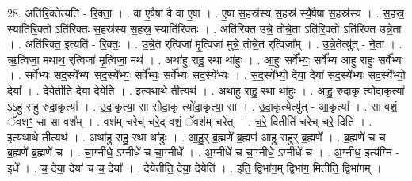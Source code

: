 \documentclass[17pt]{extarticle}
\begin{document}
28. अति॑रि॒क्तेत्यति॑ - रि॒क्ता॒ । . वा ए॒षैषा वै वा ए॒षा । . ए॒षा स॒हस्र॑स्य स॒हस्र॑ स्यै॒षैषा स॒हस्र॑स्य । . स॒हस्र॒ स्याति॑रि॒क्तो ऽति॑रिक्तः स॒हस्र॑स्य स॒हस्र॒ स्याति॑रिक्तः । . अति॑रिक्त उन्ने॒ तोन्ने॒ता ऽति॑रि॒क्तो ऽति॑रिक्त उन्ने॒ता । . अति॑रिक्त॒ इत्यति॑ - रि॒क्तः॒ । . उ॒न्ने॒त र्‌त्विजा॑ मृ॒त्विजा॑ मुन्ने॒ तोन्ने॒त र्‌त्विजा᳚म् । . उ॒न्ने॒तेत्यु॑त् - ने॒ता । . ऋ॒त्विजा॒ मथाथ॒ र्‌त्विजा॑ मृ॒त्विजा॒ मथ॑ । . अथा॑हु राहु॒ रथा था॑हुः । . आ॒हुः॒ सर्वे᳚भ्यः॒ सर्वे᳚भ्य आहु राहुः॒ सर्वे᳚भ्यः । . सर्वे᳚भ्यः सद॒स्ये᳚भ्यः सद॒स्ये᳚भ्यः॒ सर्वे᳚भ्यः॒ सर्वे᳚भ्यः सद॒स्ये᳚भ्यः । . स॒द॒स्ये᳚भ्यो॒ देया॒ देया॑ सद॒स्ये᳚भ्यः सद॒स्ये᳚भ्यो॒ देया᳚ । . देयेतीति॒ देया॒ देयेति॑ । . इत्यथाथे तीत्यथ॑ । . अथा॑हु राहु॒ रथा था॑हुः । . आ॒हु॒ रु॒दा॒कृ त्यो॑दा॒कृत्या॑ ऽऽहु राहु रुदा॒कृत्या᳚ । . उ॒दा॒कृत्या॒ सा सोदा॒कृ त्यो॑दा॒कृत्या॒ सा । . उ॒दा॒कृत्येत्यु॑त् - आ॒कृत्या᳚ । . सा वशं॒ ॅवशꣳ॒॒ सा सा वश᳚म् । . वश॑म् चरेच् चरे॒द् वशं॒ ॅवश॑म् चरेत् । . च॒रे॒ दितीति॑ चरेच् चरे॒ दिति॑ । . इत्यथाथे तीत्यथ॑ । . अथा॑हु राहु॒ रथा था॑हुः । . आ॒हु॒र् ब्र॒ह्मणे᳚ ब्र॒ह्मण॑ आहु राहुर् ब्र॒ह्मणे᳚ । . ब्र॒ह्मणे॑ च च ब्र॒ह्मणे᳚ ब्र॒ह्मणे॑ च । . चा॒ग्नीधे॒ ऽग्नीधे॑ च चा॒ग्नीधे᳚ । . अ॒ग्नीधे॑ च चा॒ग्नीधे॒ ऽग्नीधे॑ च । . अ॒ग्नीध॒ इत्य॑ग्नि - इधे᳚ । . च॒ देया॒ देया॑ च च॒ देया᳚ । . देयेतीति॒ देया॒ देयेति॑ । . इति॒ द्विभा॑ग॒म् द्विभा॑ग॒ मितीति॒ द्विभा॑गम् । \newline
\end{document}
